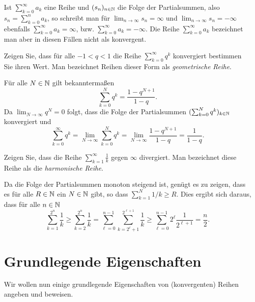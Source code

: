 \documentclass[a4paper,10pt]{article}
\begin{document}
\begin{bem}
 Ist $\sum_{k=0}^\infty a_k$ eine Reihe und $(s_n)_{n \in \mathbb{N}}$ die Folge der Partialsummen, also $s_n = \sum_{k=0}^n a_k$, so schreibt man für $\lim_{n \to \infty} s_n = \infty$ und $\lim_{n \to \infty} s_n = -\infty$ ebenfalls $\sum_{k=0}^\infty a_k = \infty$, bzw. $\sum_{k=0}^\infty a_k = -\infty$. Die Reihe $\sum_{k=0}^\infty a_k$ bezeichnet man aber in diesen Fällen nicht als konvergent.
\end{bem}


\begin{question}
 Zeigen Sie, dass für alle $-1 < q < 1$ die Reihe $\sum_{k=0}^\infty q^k$ konvergiert bestimmen Sie ihren Wert. Man bezeichnet Reihen dieser Form als \emph{geometrische Reihe}.
\end{question}
\begin{solution}
 Für alle $N \in \mathbb{N}$ gilt bekanntermaßen
 \[
  \sum_{k=0}^N q^k = \frac{1-q^{N+1}}{1-q}.
 \]
 Da $\lim_{N \to \infty} q^N = 0$ folgt, dass die Folge der Partialsummen $(\sum_{k=0}^N q^k)_{k \in \mathbb{N}}$ konvergiert und
 \[
  \sum_{k=0}^\infty q^k
  = \lim_{N \to \infty} \sum_{k=0}^N q^k
  = \lim_{N \to \infty} \frac{1-q^{N+1}}{1-q}
  = \frac{1}{1-q}.
 \]
\end{solution}


\begin{question}
 Zeigen Sie, dass die Reihe $\sum_{k=1}^\infty \frac{1}{k}$ gegen $\infty$ divergiert. Man bezeichnet diese Reihe als die \emph{harmonische Reihe}.
\end{question}
\begin{solution}
 Da die Folge der Partialsummen monoton steigend ist, genügt es zu zeigen, dass es für alle $R \in \mathbb{N}$ ein $N \in \mathbb{N}$ gibt, so dass $\sum_{k=1}^N 1/k \geq R$. Dies ergibt sich daraus, dass für alle $n \in \mathbb{N}$
 \[
  \sum_{k=1}^{2^n} \frac{1}{k}
  \geq \sum_{k=2}^{2^n} \frac{1}{k}
  = \sum_{\ell=0}^{n-1} \sum_{k=2^\ell+1}^{2^{\ell+1}} \frac{1}{k}
  \geq \sum_{\ell=0}^{n-1} 2^\ell \frac{1}{2^{\ell+1}}
  = \frac{n}{2}.
 \]
\end{solution}





\section{Grundlegende Eigenschaften}


Wir wollen nun einige grundlegende Eigenschaften von (konvergenten) Reihen angeben und beweisen.
\end{document}

